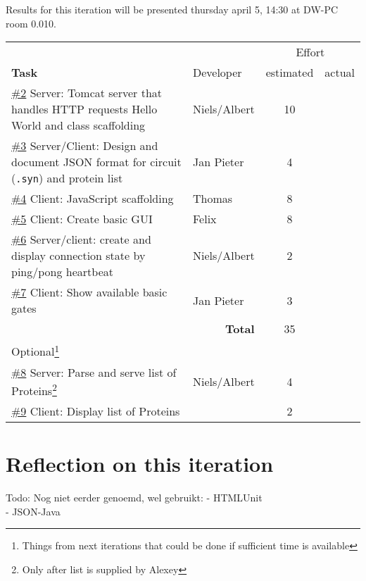 \documentclass[a4paper]{article}
\newcommand{\githubissue}[1]{\href{https://github.com/FelixAkk/synthbio/issues/#1}{\##1}}
\begin{document}
Results for this iteration will be presented thursday april 5, 14:30 at DW-PC room 0.010.
\vfill
\setlength{\extrarowheight}{3pt}
\centering\begin{tabularx}{\textwidth}{p{10cm} | l | cc}
\multicolumn{2}{c}{}& \multicolumn{2}{c}{Effort} \\	
\textbf{Task} & Developer & estimated & actual \\
\hline
\githubissue{2}
Server: Tomcat server that handles HTTP requests {\sc Hello World} and class scaffolding &
Niels/Albert & 10 & \\

\githubissue{3} Server/Client: Design and document JSON format for circuit (\verb|.syn|) and protein list &
Jan Pieter & 4 & \\

\githubissue{4} Client: JavaScript scaffolding &
Thomas & 8 & \\
 
\githubissue{5} Client: Create basic GUI &
Felix & 8 & \\
 
\githubissue{6} Server/client: create and display connection state by ping/pong heartbeat &
Niels/Albert & 2 & \\
 
\githubissue{7} Client: Show available basic gates &
Jan Pieter & 3 & \\ \hline

\multicolumn{2}{r}{\textbf{Total}  }
 & 35 & \\[8mm]
 
\multicolumn{2}{l}{Optional\footnote{Things from next iterations that could be done if sufficient time is available}} \\ \hline

\githubissue{8} Server: Parse and serve list of Proteins\footnote{Only after list is supplied by Alexey} &
Niels/Albert & 4 & \\

\githubissue{9} Client: Display list of Proteins &
 & 2 & \\
\hline 
\end{tabularx}

\section{Reflection on this iteration}

Todo:
Nog niet eerder genoemd, wel gebruikt:
- HTMLUnit \\
- JSON-Java \\
\end{document}
